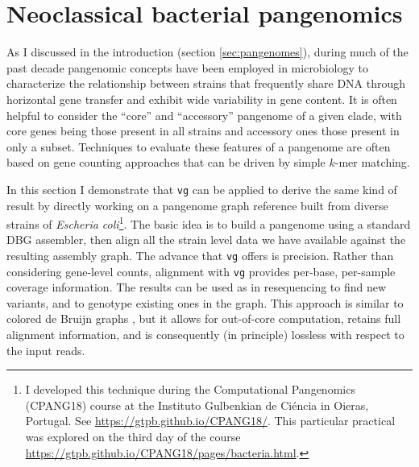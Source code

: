 \documentclass[a4paper,12pt,numbered,oneside]{Classes/PhDThesisPSnPDF}
\begin{document}
\section{Neoclassical bacterial pangenomics}

As I discussed in the introduction (section \ref{sec:pangenomes}), during much of the past decade pangenomic concepts have been employed in microbiology to characterize the relationship between strains that frequently share DNA through horizontal gene transfer and exhibit wide variability in gene content.
It is often helpful to consider the ``core'' and ``accessory'' pangenome of a given clade, with core genes being those present in all strains and accessory ones those present in only a subset.
Techniques to evaluate these features of a pangenome are often based on gene counting approaches that can be driven by simple $k$-mer matching.

In this section I demonstrate that {\tt vg} can be applied to derive the same kind of result by directly working on a pangenome graph reference built from diverse strains of \emph{Escheria coli}\footnote{I developed this technique during the Computational Pangenomics (CPANG18) course at the Instituto Gulbenkian de Ci\'{e}ncia in Oieras, Portugal. See \url{https://gtpb.github.io/CPANG18/}. This particular practical was explored on the third day of the course \url{https://gtpb.github.io/CPANG18/pages/bacteria.html}.}.
The basic idea is to build a pangenome using a standard DBG assembler, then align all the strain level data we have available against the resulting assembly graph. 
The advance that {\tt vg} offers is precision.
Rather than considering gene-level counts, alignment with {\tt vg} provides per-base, per-sample coverage information.
The results can be used as in resequencing to find new variants, and to genotype existing ones in the graph.
This approach is similar to colored de Bruijn graphs \cite{iqbal2013}, but it allows for out-of-core computation, retains full alignment information, and is consequently (in principle) lossless with respect to the input reads.
\end{document}
